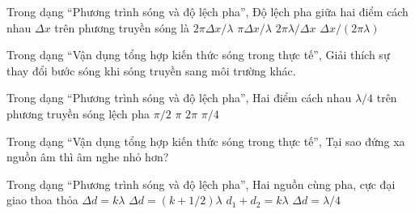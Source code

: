 \begin{ex}
Trong dạng “Phương trình sóng và độ lệch pha”, Độ lệch pha giữa hai điểm cách nhau $\Delta x$ trên phương truyền sóng là
\choice
{\True $2\pi\Delta x/\lambda$}
{$\pi\Delta x/\lambda$}
{$2\pi\lambda/\Delta x$}
{$\Delta x/(2\pi\lambda)$}
\end{ex}

\begin{ex}
Trong dạng “Vận dụng tổng hợp kiến thức sóng trong thực tế”, Giải thích sự thay đổi bước sóng khi sóng truyền sang môi trường khác.
\choiceTF

\end{ex}

\begin{ex}
Trong dạng “Phương trình sóng và độ lệch pha”, Hai điểm cách nhau $\lambda/4$ trên phương truyền sóng lệch pha
\choice
{\True $\pi/2$}
{$\pi$}
{$2\pi$}
{$\pi/4$}
\end{ex}

\begin{ex}
Trong dạng “Vận dụng tổng hợp kiến thức sóng trong thực tế”, Tại sao đứng xa nguồn âm thì âm nghe nhỏ hơn?
\choiceTF

\end{ex}

\begin{ex}
Trong dạng “Phương trình sóng và độ lệch pha”, Hai nguồn cùng pha, cực đại giao thoa thỏa
\choice
{\True $\Delta d=k\lambda$}
{$\Delta d=(k+1/2)\lambda$}
{$d_1+d_2=k\lambda$}
{$\Delta d=\lambda/4$}
\end{ex}


